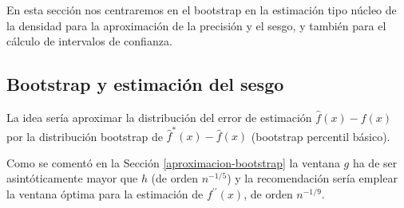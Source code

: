 \documentclass[
]{book}
\theoremstyle{break}
\theoremstyle{definition}
\theoremstyle{definition}
\theoremstyle{definition}
\theoremstyle{definition}
\theoremstyle{remark}
\begin{document}
En esta sección nos centraremos en el bootstrap
en la estimación tipo núcleo de la densidad
para la aproximación de la precisión y el sesgo,
y también para el cálculo de intervalos de confianza.

\hypertarget{bootstrap-y-estimaciuxf3n-del-sesgo}{%
\subsection{Bootstrap y estimación del sesgo}\label{bootstrap-y-estimaciuxf3n-del-sesgo}}

La idea sería aproximar la distribución del error de estimación
\(\hat f(x) - f(x)\) por la distribución bootstrap de
\(\hat f^{\ast}(x) - \hat f(x)\) (bootstrap percentil básico).

Como se comentó en la Sección \ref{aproximacion-bootstrap}
la ventana \(g\) ha de ser asintóticamente mayor que \(h\) (de orden \(n^{-1/5}\))
y la recomendación sería emplear la ventana óptima para la estimación de
\(f^{\prime \prime }\left( x \right)\), de orden \(n^{-1/9}\).
\end{document}
